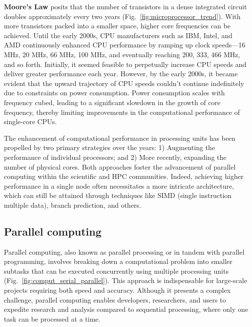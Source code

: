 \textbf{Moore's Law} posits that the number of transistors in a dense integrated circuit doubles approximately every two years (Fig.~\ref{fig:microprocessor_trend}). With more transistors packed into a smaller space, higher core frequencies can be achieved. Until the early 2000s, CPU manufacturers such as IBM, Intel, and AMD continuously enhanced CPU performance by ramping up clock speeds—16 MHz, 20 MHz, 66 MHz, 100 MHz, and eventually reaching 200, 333, 466 MHz, and so forth. Initially, it seemed feasible to perpetually increase CPU speeds and deliver greater performance each year. However, by the early 2000s, it became evident that the upward trajectory of CPU speeds couldn't continue indefinitely due to constraints on power consumption. Power consumption scales with frequency cubed, leading to a significant slowdown in the growth of core frequency, thereby limiting improvements in the computational performance of single-core CPUs.

\par

The enhancement of computational performance in processing units has been propelled by two primary strategies over the years: 1) Augmenting the performance of individual processors; and 2) More recently, expanding the number of physical cores. Both approaches foster the advancement of parallel computing within the scientific and HPC communities. Indeed, achieving higher performance in a single node often necessitates a more intricate architecture, which can still be attained through techniques like SIMD (single instruction multiple data), branch prediction, and others.




\subsection{Parallel computing}


\par
Parallel computing, also known as parallel processing or in tandem with parallel programming, involves breaking down a computational problem into smaller subtasks that can be executed concurrently using multiple processing units (Fig.~\ref{fig:comput_serial_parallel}). This approach is indispensable for large-scale projects requiring both speed and accuracy. Although it presents a complex challenge, parallel computing enables developers, researchers, and users to expedite research and analysis compared to sequential processing, where only one task can be processed at a time.



